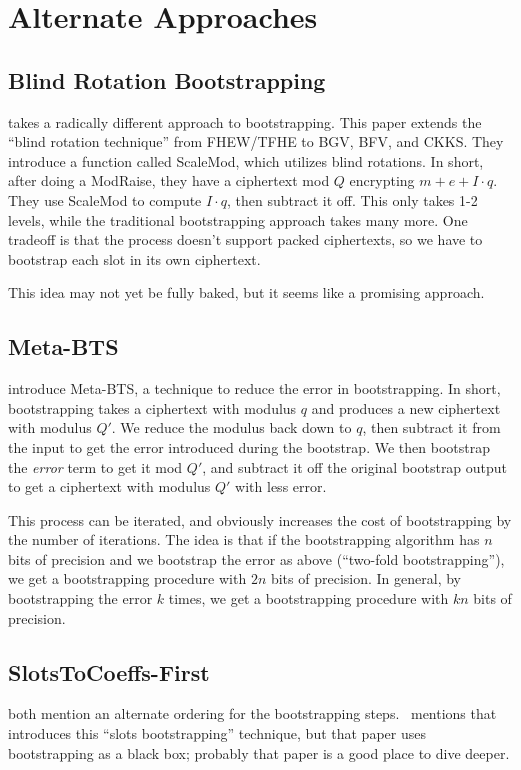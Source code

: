 \documentclass[../fheimpl.tex]{subfiles}
\begin{document}
    \section{Alternate Approaches}
    \subsection{Blind Rotation Bootstrapping}
    \cite{cryptoeprint:2021/691} takes a radically different approach to bootstrapping. This paper extends the ``blind rotation technique'' from FHEW/TFHE to BGV, BFV, and CKKS. They introduce a function called ScaleMod, which utilizes blind rotations. In short, after doing a ModRaise, they have a ciphertext mod $Q$ encrypting $m+e+I\cdot q$. They use ScaleMod to compute $I\cdot q$, then subtract it off. This only takes 1-2 levels, while the traditional bootstrapping approach takes many more. One tradeoff is that the process doesn't support packed ciphertexts, so we have to bootstrap each slot in its own ciphertext.
    
    This idea may not yet be fully baked, but it seems like a promising approach.
    
    \subsection{Meta-BTS}
    \cite{cryptoeprint:2022/1167} introduce Meta-BTS, a technique to reduce the error in bootstrapping. In short, bootstrapping takes a ciphertext with modulus $q$ and produces a new ciphertext with modulus $Q'$. We reduce the modulus back down to $q$, then subtract it from the input to get the error introduced during the bootstrap. We then bootstrap the \emph{error} term to get it mod $Q'$, and subtract it off the original bootstrap output to get a ciphertext with modulus $Q'$ with less error.
    
    This process can be iterated, and obviously increases the cost of bootstrapping by the number of iterations. The idea is that if the bootstrapping algorithm has $n$ bits of precision and we bootstrap the error as above (``two-fold bootstrapping''), we get a bootstrapping procedure with $2n$ bits of precision. In general, by bootstrapping the error $k$ times, we get a bootstrapping procedure with $kn$ bits of precision.
    
    \subsection{SlotsToCoeffs-First}
    \cite{cryptoeprint:2022/1167, cryptoeprint:2024/1284} both mention an alternate ordering for the bootstrapping steps.~\cite[Footnote 3]{cryptoeprint:2024/1638} mentions that~\cite{cryptoeprint:2022/1167} introduces this ``slots bootstrapping'' technique, but that paper uses bootstrapping as a black box; probably that paper is a good place to dive deeper.
    
\end{document}
